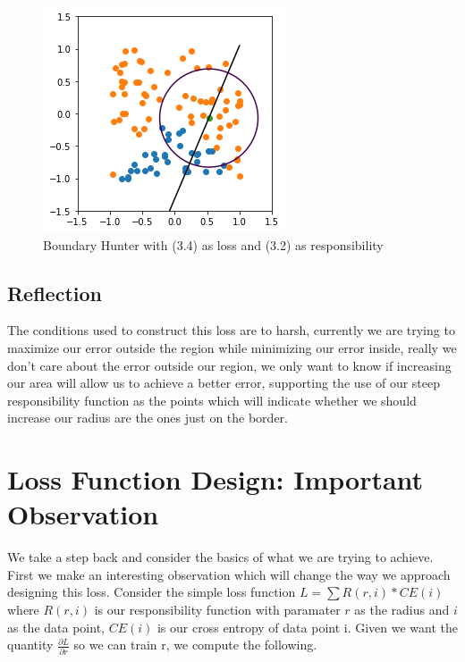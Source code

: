 \documentclass[notitlepage]{report}
\theoremstyle{definition}
\begin{document}
\begin{figure}[H]
\centering
  \begin{minipage}[b]{0.4\textwidth}
    \includegraphics[width=\textwidth]{BoundaryHunter-Attempt2-01.png}
    \caption{Boundary Hunter with (3.4) as loss and (3.2) as responsibility}
  \end{minipage}
  \hfill
\end{figure}

\subsection{Reflection}
The conditions used to construct this loss are to harsh, currently we are trying to maximize our error outside the region while minimizing our error inside, really we don't care about the error outside our region, we only want to know if increasing our area will allow us to achieve a better error, supporting the use of our steep responsibility function as the points which will indicate whether we should increase our radius are the ones just on the border.

\section{Loss Function Design: Important Observation}
We take a step back and consider the basics of what we are trying to achieve. First we make an interesting observation which will change the way we approach designing this loss. Consider the simple loss function $L =\sum R(r, i) * CE(i)$ where $R(r, i)$ is our responsibility function with paramater $r$ as the radius and $i$ as the data point, $CE(i)$ is our cross entropy of data point i. Given we want the quantity $\frac{\partial L}{\partial r}$ so we can train r, we compute the following.
\end{document}
